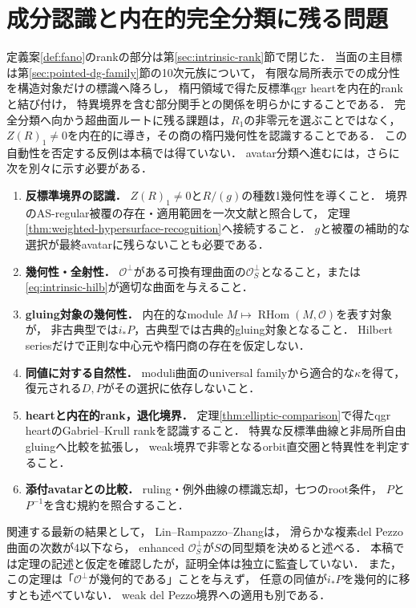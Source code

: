 \documentclass[11pt,a4paper]{ltjsarticle}
\theoremstyle{definition}
\newcommand{\OO}{\mathcal O}
\newcommand{\RHom}{\operatorname{RHom}}
\begin{document}
\section{成分認識と内在的完全分類に残る問題}
定義案\ref{def:fano}のrankの部分は第\ref{sec:intrinsic-rank}節で閉じた．
当面の主目標は第\ref{sec:pointed-dg-family}節の10次元族について，
有限な局所表示での成分性を構造対象だけの標識へ降ろし，
楕円領域で得た反標準qgr heartを内在的rankと結び付け，
特異境界を含む部分関手との関係を明らかにすることである．
完全分類へ向かう超曲面ルートに残る課題は，$R_1$の非零元を選ぶことではなく，
$Z(R)_1\ne0$を内在的に導き，その商の楕円幾何性を認識することである．
この自動性を否定する反例は本稿では得ていない．
avatar分類へ進むには，さらに次を別々に示す必要がある．
\begin{enumerate}
\item \textbf{反標準境界の認識．}
$Z(R)_1\ne0$と$R/(g)$の種数1幾何性を導くこと．
境界のAS-regular被覆の存在・適用範囲を一次文献と照合して，
定理\ref{thm:weighted-hypersurface-recognition}へ接続すること．
$g$と被覆の補助的な選択が最終avatarに残らないことも必要である．
\item \textbf{幾何性・全射性．}
$\OO^\perp$がある可換有理曲面の$\OO_S^\perp$となること，または
\eqref{eq:intrinsic-hilb}が適切な曲面を与えること．
\item \textbf{gluing対象の幾何性．}
内在的なmodule $M\mapsto\RHom(M,\OO)$を表す対象が，
非古典型では$i_*P$，古典型では古典的gluing対象となること．
Hilbert seriesだけで正則な中心元や楕円商の存在を仮定しない．
\item \textbf{同値に対する自然性．}
moduli曲面のuniversal familyから適合的な$\kappa$を得て，
復元される$D,P$がその選択に依存しないこと．
\item \textbf{heartと内在的rank，退化境界．}
定理\ref{thm:elliptic-comparison}で得たqgr heartのGabriel--Krull rankを認識すること．
特異な反標準曲線と非局所自由gluingへ比較を拡張し，
weak境界で非零となるorbit直交圏と特異性を判定すること．
\item \textbf{添付avatarとの比較．}
ruling・例外曲線の標識忘却，七つのroot条件，
$P$と$P^{-1}$を含む規約を照合すること．
\end{enumerate}

関連する最新の結果として，
Lin--Rampazzo--Zhang\cite[Theorem 1.2]{LRZ}は，
滑らかな複素del Pezzo曲面の次数が4以下なら，
enhanced $\OO_S^\perp$が$S$の同型類を決めると述べる．
本稿では定理の記述と仮定を確認したが，証明全体は独立に監査していない．
また，この定理は「$\OO^\perp$が幾何的である」ことを与えず，
任意の同値が$i_*P$を幾何的に移すとも述べていない．
weak del Pezzo境界への適用も別である．
\end{document}
